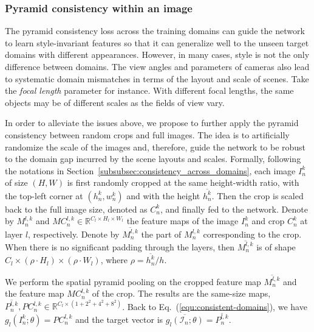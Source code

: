 \documentclass[10pt,twocolumn,letterpaper]{article}
\newcommand{\eat}[1]{}
\begin{document}
\eat{
get the $g_l$ and $\widehat{g_l}$ for the pyramid consistency across domains:
\begin{align}
&g_l(I_n^k;\theta) = P_n^{l,k}\\
&\widehat{g_l}(I_0,\cdots,I_K;\theta) = \frac{1}{K+1}\sum_{k=0}^K P_n^{l,k}
\end{align}
}


\vspace{-4mm}
\subsubsection{Pyramid consistency within an image}
\label{subsubsec:consistency_within_image}
The pyramid consistency loss across the training domains can guide the network to learn style-invariant features so that it can generalize well to the unseen target domains with different appearances. However, in many cases, style is not the only difference between domains. The view angles and parameters of cameras also lead to systematic domain mismatches in terms of the layout and scale of scenes. Take the \textit{focal length} parameter for instance. With different focal lengths, the same objects may be of different scales as the fields of view vary. 

In order to alleviate the issues above, we propose to further apply the pyramid consistency between random crops  and  full images. The idea is to artificially randomize the scale of the images and, therefore, guide the network to be robust to the domain gap incurred by the scene layouts and scales. Formally, following the notations in Section~\ref{subsubsec:consistency_across_domains}, each image $I_n^k$ of size $(H, W)$ is first randomly cropped at the same height-width ratio, with the top-left corner at $(h_n^k, w_n^k)$ and with the height $\overline{h_n^k}$. Then the crop is scaled back to the full image size, denoted as $C_n^k$, and finally fed to the network. Denote by $M^{l,k}_n$ and $MC^{l,k}_n \in \mathbb{R}^{C_l \times H_l \times W_l}$ the feature maps of the image $I_n^k$ and crop $C_n^k$ at layer $l$, respectively. Denote by $\overline{M^{l,k}_n}$ the part of $M^{l,k}_n$ corresponding to the crop. When there is no significant padding through the layers, then $\overline{M^{l,k}_n}$ is of shape ${C_l \times (\rho\cdot H_l) \times (\rho\cdot W_l)}$, where $\rho ={\overline{h_n^k}}/{h} $. 

We perform the spatial pyramid pooling on the cropped feature map $\overline{M^{l,k}_n}$ and the feature map $MC^{l,k}_n$ of the crop. The results are the same-size maps, $\overline{P_n^{l,k}}, PC_n^{l,k} \in \mathbb{R}^{C_l\times\left(1+2^2+4^2+8^2\right)}$. Back to Eq.~(\ref{equ:consistent-domains}), we have $g_l(I_n^k;\theta)=PC_n^{l,k}$ and the target vector is $\overline{g_l(\mathcal{I}_n;\theta)}=\overline{P_n^{l,k}}$.
\end{document}
